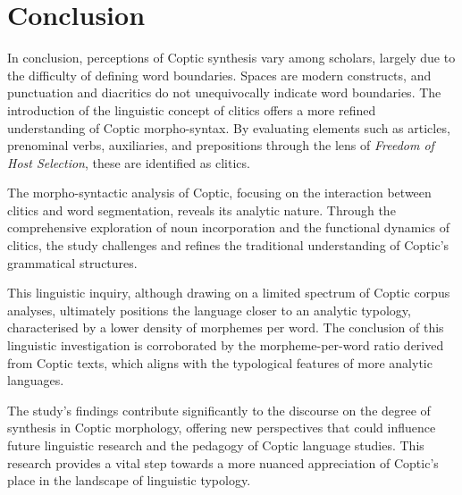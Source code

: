 \documentclass[output=paper,colorlinks,citecolor=brown ,chinesefont]{langscibook}
\begin{document}
\section{Conclusion}
   In conclusion, perceptions of Coptic synthesis vary among scholars, largely due to the difficulty of defining word boundaries. Spaces are modern constructs, and punctuation and diacritics do not unequivocally indicate word boundaries. The introduction of the linguistic concept of clitics offers a more refined understanding of Coptic morpho-syntax. By evaluating elements such as articles, prenominal verbs, auxiliaries, and prepositions through the lens of \textit{Freedom of Host Selection}, these are identified as clitics. 
   
   
   The morpho-syntactic analysis of Coptic, focusing on the interaction between clitics and word segmentation, reveals its analytic nature. Through the comprehensive exploration of noun incorporation and the functional dynamics of clitics, the study challenges and refines the traditional understanding of Coptic's grammatical structures. 
   
   
   This linguistic inquiry, although drawing on a limited spectrum of Coptic corpus analyses, ultimately positions the language closer to an analytic typology, characterised by a lower density of morphemes per word. The conclusion of this linguistic investigation is corroborated by the morpheme-per-word ratio derived from Coptic texts, which aligns with the typological features of more analytic languages. 
   
   
   The study's findings contribute significantly to the discourse on the degree of synthesis in Coptic morphology, offering new perspectives that could influence future linguistic research and the pedagogy of Coptic language studies. This research provides a vital step towards a more nuanced appreciation of Coptic's place in the landscape of linguistic typology.
\end{document}
